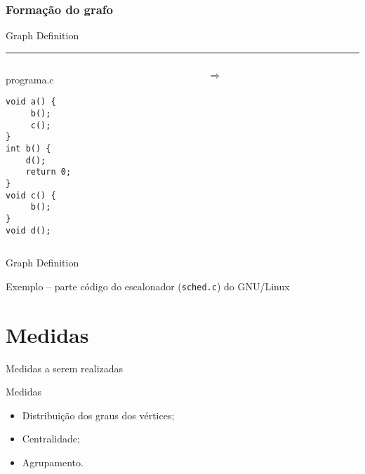 \documentclass[ignorenonframetext]{beamer}
\def\vertices{vértices}
\def\graphdef{Graph Definition}
\begin{document}
\begin{frame}[fragile]
\frametitle{Formação do grafo}
\small

\graphdef

\hrule
\bigskip
\begin{columns}
\begin{column}{0.25\textwidth}
programa.c
\begin{verbatim}
void a() {
     b();
     c();
}
int b() {
    d();
    return 0;
}
void c() {
     b();
}
void d();
\end{verbatim}
\end{column}
{\LARGE $\Rightarrow$}\hspace{0.25cm}
\begin{column}{0.45\textwidth}


\end{column}
\end{columns}

\end{frame}

\begin{frame}

\graphdef

\begin{block}{Exemplo -- parte código do escalonador ({\tt sched.c}) do GNU/Linux}
  
\end{block}

\end{frame}

\section{Medidas}

\begin{frame}{Medidas a serem realizadas}

\begin{block}{Medidas}
\begin{itemize}
  \item Distribuição dos graus dos \vertices{};
  \item Centralidade;
  \item Agrupamento.
 \end{itemize}
\end{block}
\end{frame}
\end{document}
